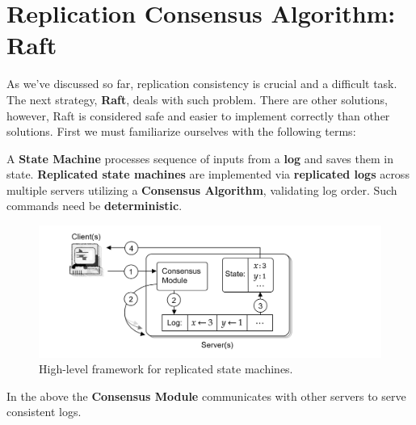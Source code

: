 \section{Replication Consensus Algorithm: Raft}
As we've discussed so far, replication consistency is crucial and a 
difficult task. The next strategy, \textbf{Raft}, deals with such problem.
There are other solutions, however, Raft is considered safe and easier to 
implement correctly than other solutions. First we must familiarize ourselves with the following terms:
\begin{Def}
    
    A \textbf{State Machine} processes sequence of inputs from a \textbf{log} and saves them
    in state.
    \textbf{Replicated state machines} are implemented via \textbf{replicated logs} across multiple servers
    utilizing a \textbf{Consensus Algorithm}, validating log order. Such commands need be \textbf{deterministic}.
\end{Def}

\vspace{-1.5em}
\begin{figure}[h]
    \centering
    \includegraphics[width=1\textwidth]{Sections/raft/state.png}
    \caption{High-level framework for replicated state machines.}
\end{figure}

\noindent
In the above the \textbf{Consensus Module} communicates with other servers to serve consistent logs. 

\newpage 
